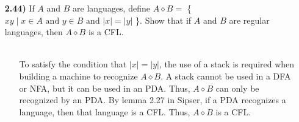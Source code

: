\documentclass[12pt]{letter}
\begin{document}
\begin{enumerate}
\item[\textbf{2.44)}] If $A$ and $B$ are languages, define $A \diamond B = $ \{ $xy \mid x \in A \text{ and } y \in B \text{ and } |x| = |y| $ \}. Show that if $A$ and $B$ are regular languages, then $A \diamond B$ is a CFL. \\
\leavevmode \\
 \begin{enumerate}
\item[] To satisfy the condition that $|x| = |y|$, the use of a stack is required when building a machine to recognize $A \diamond B$. A stack cannot be used in a DFA or NFA, but it can be used in an PDA. Thus, $A \diamond B$ can only be recognized by an PDA. By lemma 2.27 in Sipser, if a PDA recognizes a language, then that language is a CFL. Thus, $A \diamond B$ is a CFL.
\end{enumerate}










































\end{enumerate}
\end{document}
